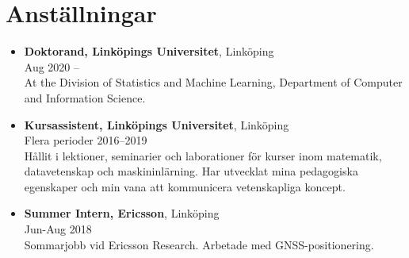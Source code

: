 \documentclass[12pt]{article}
\newcommand{\text}[2]{#2}
\newcommand{\text}[2]{#1}
\begin{document}
\section*{\text{Employment}{Anställningar}}
\begin{itemize}
    \item \textbf{\text{PhD Student, Linköping University}{Doktorand, Linköpings Universitet}}, Linköping\\
    Aug 2020 --\\
    At the Division of Statistics and Machine Learning, Department of Computer and Information Science.

    \item \textbf{\text{Teaching Assistant, Linköping University}{Kursassistent, Linköpings Universitet}}, Linköping\\
        \text{Multiple periods}{Flera perioder} 2016--2019\\
        \text{
            Held lessons, seminars and lab-sessions for courses in mathematics, computer science and machine learning. Developed my teaching skills and my ability to communicate scientific concepts.
        }{
            Hållit i lektioner, seminarier och laborationer för kurser inom matematik, datavetenskap och maskininlärning. Har utvecklat mina pedagogiska egenskaper och min vana att kommunicera vetenskapliga koncept.
        }
    \item \textbf{Summer Intern, Ericsson}, Linköping\\
        Jun-Aug 2018\\
        \text{
            Summer internship at Ericsson Research. Worked with GNSS positioning.
        }{
            Sommarjobb vid Ericsson Research. Arbetade med GNSS-positionering.
        }

\end{itemize}
\end{document}
